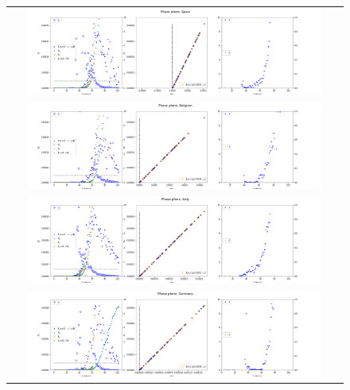 \documentclass[8pt]{article}
\begin{document}
\begin{figure}[h] \label{Planos fase y obtención de parámetros a partir de dinámica de casos observada en algunos países de Europa}
\begin{tabular}{c}
\includegraphics[width=0.9\textwidth]{../figures_COVID19_dataAnalysis/dam_COVID19_JHU_phasePlane_Spain}
\\
\includegraphics[width=0.9\textwidth]{../figures_COVID19_dataAnalysis/dam_COVID19_JHU_phasePlane_Belgium}
\\
\includegraphics[width=0.9\textwidth]{../figures_COVID19_dataAnalysis/dam_COVID19_JHU_phasePlane_Italy}
\\
\includegraphics[width=0.9\textwidth]{../figures_COVID19_dataAnalysis/dam_COVID19_JHU_phasePlane_Germany}
\end{tabular}
\end{figure}
\end{document}

